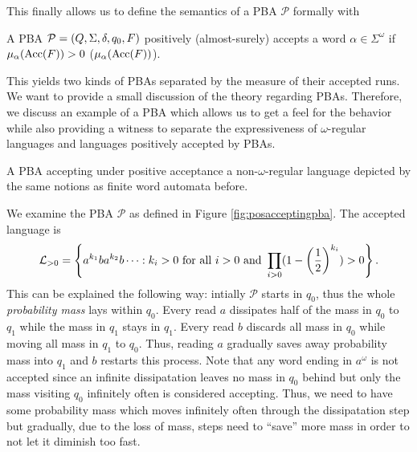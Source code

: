 This finally allows us to define the semantics of a \ac{PBA} $\mathcal{P}$
formally with
\begin{definition}
  A \ac{PBA} $\mathcal{P} = \left(Q, \Sigma, \delta, q_{0}, F\right)$ positively 
  (almost-surely) accepts a word $\alpha\in\Sigma^{\omega}$ if
  $\mu_{\alpha}(\operatorname{Acc}(F)) > 0$ ($\mu_{\alpha}(\operatorname{Acc}(F))$).
\end{definition}
This yields two kinds of \acp{PBA} separated by the measure of their accepted 
runs. We want to provide a small discussion of the theory regarding \acp{PBA}.
Therefore, we discuss an example of a \ac{PBA} which allows us to get a feel 
for the behavior while also providing a witness to separate the expressiveness 
of $\omega$-regular languages and languages positively accepted by \acp{PBA}.
\begin{drawing}
  \caption{A \ac{PBA} accepting under positive acceptance a 
  non-$\omega$-regular language depicted by the same notions as finite word 
  automata before.}
  \label{fig:posacceptingpba}
  \begin{center}
  \end{center}
\end{drawing}
\begin{example}
  \cite{RecOmeLangProbAuto}
  We examine the \ac{PBA} $\mathcal{P}$ as defined in Figure 
  \ref{fig:posacceptingpba}. The accepted language is 
  \begin{equation*}
    \mathcal{L}_{>0} = \left\{a^{k_{1}}ba^{k_{2}}b\dots:k_{i}>0\text{ for all }
    i>0\text{ and } \prod_{i>0}(1-\left(\frac{1}{2}\right)^{k_{i}}) > 0\right\}.
  \end{equation*}
  This can be explained the following way: intially $\mathcal{P}$ starts in 
  $q_{0}$, thus the whole \emph{probability mass} lays within $q_{0}$. Every
  read $a$ dissipates half of the mass in $q_{0}$ to $q_{1}$ while the mass in
  $q_{1}$ stays in $q_{1}$. Every read $b$ discards all mass in $q_{0}$ while
  moving all mass in $q_{1}$ to $q_{0}$. Thus, reading $a$ gradually saves away
  probability mass into $q_{1}$ and $b$ restarts this process. Note that any 
  word ending in $a^{\omega}$ is not accepted since an infinite dissipatation 
  leaves no mass in $q_{0}$ behind but only the mass visiting $q_{0}$ 
  infinitely often is considered accepting. Thus, we need to have some 
  probability mass which moves infinitely often through the dissipatation step 
  but gradually, due to the loss of mass, steps need to \enquote{save} more 
  mass in order to not let it diminish too fast.
  \label{ex:posacceptingpba}
\end{example}
